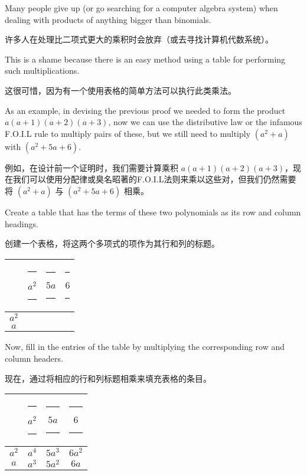 Many people give up (or go searching for a computer algebra system) 
when dealing with products of anything bigger than binomials.

许多人在处理比二项式更大的乘积时会放弃（或去寻找计算机代数系统）。

This 
is a shame because there is an easy method using a table for performing 
such multiplications.

这很可惜，因为有一个使用表格的简单方法可以执行此类乘法。

As an example, in devising the previous proof we 
needed to form the product $a(a+1)(a+2)(a+3)$, now we can use the
distributive law or the infamous F.O.I.L rule to multiply pairs of these, 
but we still need to multiply $(a^2+a)$ with $(a^2+5a+6)$.

例如，在设计前一个证明时，我们需要计算乘积 $a(a+1)(a+2)(a+3)$，现在我们可以使用分配律或臭名昭著的F.O.I.L法则来乘以这些对，但我们仍然需要将 $(a^2+a)$ 与 $(a^2+5a+6)$ 相乘。

Create a 
table that has the terms of these two polynomials as its row and column 
headings.

创建一个表格，将这两个多项式的项作为其行和列的标题。

\begin{center}
\begin{tabular}{c|ccc}
      & \rule{3pt}{0pt} $a^2$ \rule{3pt}{0pt}  & \rule{3pt}{0pt}  $5a$ \rule{3pt}{0pt}  & \rule{3pt}{0pt}  $6$  \rule{3pt}{0pt} \\ \hline
$a^2$ &         &      & \\
$a$   &         &      & \\
\end{tabular}
\end{center}

Now, fill in the entries of the table by multiplying the corresponding 
row and column headers.

现在，通过将相应的行和列标题相乘来填充表格的条目。

\begin{center}
\begin{tabular}{c|ccc}
      &  \rule{3pt}{0pt}   $a^2$ \rule{3pt}{0pt}  & \rule{3pt}{0pt}  $5a$  \rule{3pt}{0pt}   &  \rule{3pt}{0pt} $6$  \rule{3pt}{0pt} \\ \hline
$a^2$ &   $a^4$ & $5a^3$ & $6a^2$ \\
$a$   &   $a^3$ & $5a^2$ & $6a$ \\
\end{tabular}
\end{center}

